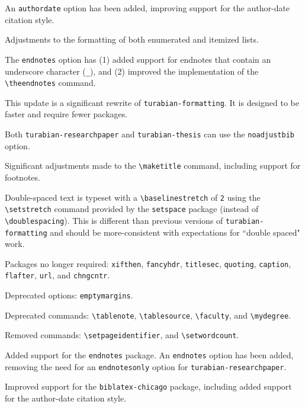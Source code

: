 \documentclass{article}
\begin{document}
%

An \texttt{authordate} option has been added, improving support for the author-date citation style.

Adjustments to the formatting of both enumerated and itemized lists.

The \texttt{endnotes} option has (1) added support for endnotes that contain an underscore character (\texttt{\_}), and (2) improved the implementation of the \texttt{\textbackslash theendnotes} command.

%

This update is a significant rewrite of \texttt{turabian-formatting}. It is designed to be faster and require fewer packages.

Both \texttt{turabian-researchpaper} and \texttt{turabian-thesis} can use the \texttt{noadjustbib} option.

Significant adjustments made to the \texttt{\textbackslash maketitle} command, including support for footnotes.

Double-spaced text is typeset with a \texttt{\textbackslash baselinestretch} of \texttt{2} using the \texttt{\textbackslash setstretch} command provided by the \texttt{setspace} package (instead of \texttt{\textbackslash doublespacing}). This is different than previous versions of \texttt{turabian-formatting} and should be more-consistent with expectations for ``double spaced" work.

Packages no longer required: \texttt{xifthen}, \texttt{fancyhdr}, \texttt{titlesec}, \texttt{quoting}, \texttt{caption}, \texttt{flafter}, \texttt{url}, and \texttt{chngcntr}.

Deprecated options: \texttt{emptymargins}.

Deprecated commands: \texttt{\textbackslash tablenote}, \texttt{\textbackslash tablesource}, \texttt{\textbackslash faculty}, and \texttt{\textbackslash mydegree}.

Removed commands: \texttt{\textbackslash setpageidentifier}, and \texttt{\textbackslash setwordcount}.

%

Added support for the \texttt{endnotes} package. An \texttt{endnotes} option has been added, removing the need for an \texttt{endnotesonly} option for \texttt{turabian-researchpaper}.

Improved support for the \texttt{biblatex-chicago} package, including added support for the author-date citation style.
\end{document}
